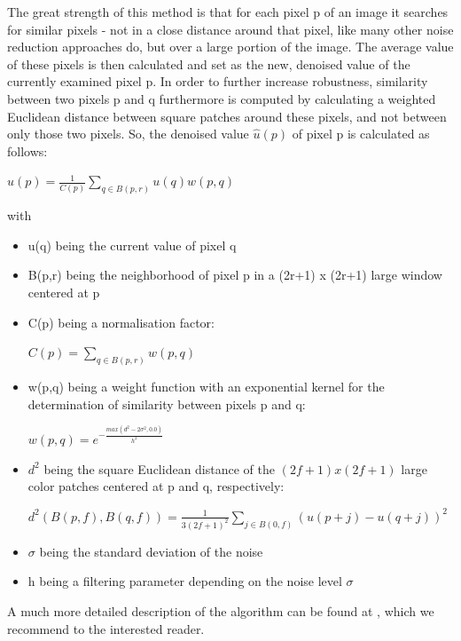 \documentclass{article}
\begin{document}
The great strength of this method is that for each pixel p of an image it searches for similar pixels - not in a close distance around that pixel, like many other noise reduction approaches do, but over a large portion of the image. The average value of these pixels is then calculated and set as the new, denoised value of the currently examined pixel p. In order to further increase robustness, similarity between two pixels p and q furthermore is computed by calculating a weighted Euclidean distance between square patches around these pixels, and not between only those two pixels. 
So, the denoised value $\hat{u}(p)$ of pixel p is calculated as follows:
\begin{center}
	$ \hat{u}(p) = \frac{1}{C(p)}\sum_{q \in B(p,r)}u(q)w(p,q) $
\end{center}
with
\begin{itemize}
	\item u(q) being the current value of pixel q
	\item B(p,r) being the  neighborhood of pixel p in a (2r+1) x (2r+1) large window centered at p
	\item C(p) being a normalisation factor:
	\begin{center} $ C(p) = \sum_{q \in B(p,r)} w(p,q) $ \end{center}
	\item w(p,q) being a weight function with an exponential kernel for the determination of similarity between pixels p and q:
	\begin{center}$ w(p,q) = e^{-\frac{max(d^2-2\sigma^2, 0.0)}{h^2}} $ \end{center}
	\item $d^2$ being the square Euclidean distance of the $(2f+1) x (2f+1)$ large color patches centered at p and q, respectively:
	\begin{center}
		$ d^2(B(p,f), B(q,f)) = \frac{1}{3(2f+1)^2}\sum_{j \in B(0,f)}(u(p+j)-u(q+j))^2$
	\end{center}
	\item $\sigma$ being the standard deviation of the noise
	\item h being a filtering parameter depending on the noise level $\sigma$
\end{itemize}
A much more detailed description of the algorithm can be found at \cite{ipol.2011.bcm_nlm}, which we recommend to the interested reader.
\end{document}

